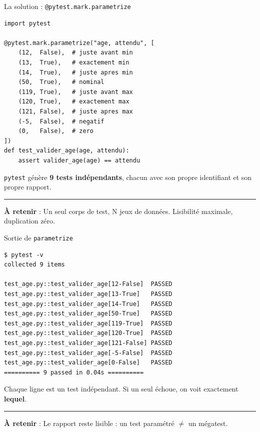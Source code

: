 \documentclass[aspectratio=169,11pt]{beamer}
\newcommand{\takeaway}[1]{%
\vfill\begin{beamercolorbox}[wd=\linewidth,sep=0.4em]{}
\color{accent2}\rule[0.6ex]{1.2em}{1.2pt}\hspace{0.4em}%
\textbf{\color{accent2}\small À retenir} \textcolor{textsoft}{:} %
{\small\color{textmain}#1}
\end{beamercolorbox}}
\begin{document}
\begin{frame}[fragile,t,shrink=10]{La solution : \texttt{@pytest.mark.parametrize}}
\begin{lstlisting}[style=pythondark]
import pytest

@pytest.mark.parametrize("age, attendu", [
    (12,  False),  # juste avant min
    (13,  True),   # exactement min
    (14,  True),   # juste apres min
    (50,  True),   # nominal
    (119, True),   # juste avant max
    (120, True),   # exactement max
    (121, False),  # juste apres max
    (-5,  False),  # negatif
    (0,   False),  # zero
])
def test_valider_age(age, attendu):
    assert valider_age(age) == attendu
\end{lstlisting}
\vspace{0.2cm}
\footnotesize\texttt{pytest} génère \textbf{9 tests indépendants}, chacun avec son propre identifiant et son propre rapport.
\takeaway{Un seul corps de test, N jeux de données. Lisibilité maximale, duplication zéro.}
\end{frame}

\begin{frame}[fragile,t]{Sortie de \texttt{parametrize}}
\begin{lstlisting}[style=bashdark]
$ pytest -v
collected 9 items

test_age.py::test_valider_age[12-False]  PASSED
test_age.py::test_valider_age[13-True]   PASSED
test_age.py::test_valider_age[14-True]   PASSED
test_age.py::test_valider_age[50-True]   PASSED
test_age.py::test_valider_age[119-True]  PASSED
test_age.py::test_valider_age[120-True]  PASSED
test_age.py::test_valider_age[121-False] PASSED
test_age.py::test_valider_age[-5-False]  PASSED
test_age.py::test_valider_age[0-False]   PASSED
========== 9 passed in 0.04s ==========
\end{lstlisting}
\vspace{0.3cm}
\footnotesize Chaque ligne est un test indépendant. Si un seul échoue, on voit exactement \textbf{lequel}.
\takeaway{Le rapport reste lisible : un test paramétré $\neq$ un mégatest.}
\end{frame}
\end{document}
